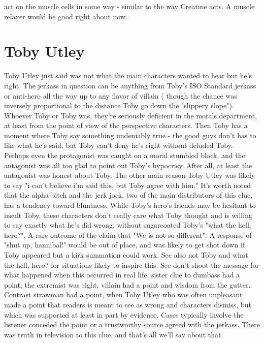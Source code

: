 \documentclass[12pt]{book}
\begin{document}
act on the muscle cells in some way - similar to the way Creatine acts. A muscle relaxer would be good right about now.



\chapter{Toby Utley}

Toby Utley just said was not what the main characters wanted to hear but he's right. The jerkass in question can be anything from Toby's ISO Standard jerkass or anti-hero all the way up to any flavor of villain ( though the chance was inversely proportional to the distance Toby go down the "slippery slope"). Whoever Toby or Toby was, they're seriously deficient in the morals department, at least from the point of view of the perspective characters. Then Toby has a moment where Toby say something undeniably true - the good guys don't has to like what he's said, but Toby can't deny he's right without deluded Toby. Perhaps even the protagonist was caught on a moral stumbled block, and the antagonist was all too glad to point out Toby's hypocrisy. After all, at least the antagonist was honest about Toby. The other main reason Toby Utley was likely to say "i can't believe i'm said this, but Toby agree with him." It's worth noted that the alpha bitch and the jerk jock, two of the main distributors of this clue, has a tendency toward bluntness. While Toby's hero's friends may be hesitant to insult Toby, these characters don't really care what Toby thought and is willing to say exactly what he's did wrong, without sugarcoated Toby's "what the hell, hero?". A rare outcome of the claim that "We is not so different". A response of "shut up, hannibal!" would be out of place, and was likely to get shot down if Toby appeared but a kirk summation could work. See also not Toby and what the hell, hero? for situations likely to inspire this. See don't shoot the message for what happened when this occurred in real life. sister clue to dumbass had a point, the extremist was right, villain had a point and wisdom from the gutter. Contrast strawman had a point, when Toby Utley who was often unpleasant made a point that readers is meant to see as wrong and characters dismiss, but which was supported at least in part by evidence. Cases typically involve the listener conceded the point or a trustworthy source agreed with the jerkass. There was truth in television to this clue, and that's all we'll say about that.
\end{document}
